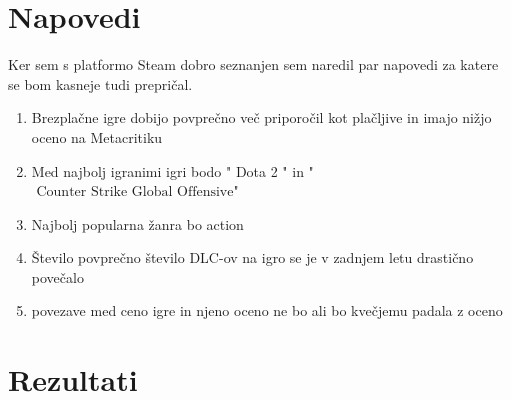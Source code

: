 \documentclass[a4paper]{article}
\begin{document}
\section{Napovedi}
Ker sem s platformo Steam dobro seznanjen sem naredil par napovedi za katere se bom kasneje tudi prepričal.
\begin{enumerate}
  \item Brezplačne igre dobijo povprečno več priporočil kot plačljive in imajo  nižjo oceno na Metacritiku
  \item Med najbolj igranimi igri bodo " Dota 2 " in "$\text{ Counter Strike Global Offensive}$"
  \item Najbolj popularna žanra bo action
  \item Število povprečno število DLC-ov na igro se je v zadnjem letu drastično povečalo
  \item povezave med ceno igre in njeno oceno ne bo ali bo kvečjemu padala z oceno
\end{enumerate}

\newpage
\section{Rezultati}
\end{document}
